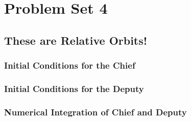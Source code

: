 \section{Problem Set 4}
\subsection{These are Relative Orbits!}

\subsubsection{Initial Conditions for the Chief}


\subsubsection{Initial Conditions for the Deputy}


\subsubsection{Numerical Integration of Chief and Deputy}

